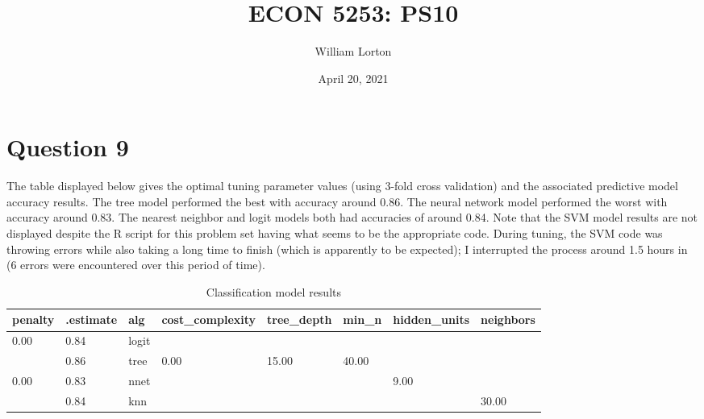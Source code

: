 \documentclass{article}
\title{ECON 5253: PS10}
\author{William Lorton}
\date{April 20, 2021}
\begin{document}
\maketitle

\section{Question 9}

The table displayed below gives the optimal tuning parameter values (using 3-fold cross validation) and the associated predictive model accuracy results. The tree model performed the best with accuracy around 0.86. The neural network model performed the worst with accuracy around 0.83. The nearest neighbor and logit models both had accuracies of around 0.84. Note that the SVM model results are not displayed despite the R script for this problem set having what seems to be the appropriate code. During tuning, the SVM code was throwing errors while also taking a long time to finish (which is apparently to be expected); I interrupted the process around 1.5 hours in (6 errors were encountered over this period of time).

\begin{table}
\centering
\begin{tabular}[t]{llllllll}
\toprule
penalty & .estimate & alg & cost\_complexity & tree\_depth & min\_n & hidden\_units & neighbors\\
\midrule
0.00 & 0.84 & logit &  &  &  &  & \\
 & 0.86 & tree & 0.00 & 15.00 & 40.00 &  & \\
0.00 & 0.83 & nnet &  &  &  & 9.00 & \\
 & 0.84 & knn &  &  &  &  & 30.00\\
\bottomrule
\end{tabular}
\caption{\label{tab:table-name}Classification model results}
\end{table}
\end{document}
